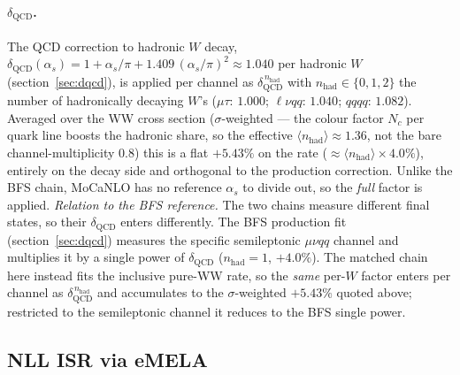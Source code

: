 \documentclass[11pt,a4paper]{article}
\begin{document}
\paragraph{$\delta_\text{QCD}$.} The QCD correction to hadronic $W$ decay,
$\delta_\text{QCD}(\alpha_s)=1+\alpha_s/\pi+1.409\,(\alpha_s/\pi)^2\approx1.040$ per
hadronic $W$~\cite{BFSnnlo} (section~\ref{sec:dqcd}), is applied per channel as
$\delta_\text{QCD}^{\,n_\text{had}}$ with $n_\text{had}\in\{0,1,2\}$ the number of
hadronically decaying $W$'s ($\mu\tau$: $1.000$; $\ell\nu qq$: $1.040$; $qqqq$:
$1.082$). Averaged over the WW cross section ($\sigma$-weighted --- the colour factor
$N_c$ per quark line boosts the hadronic share, so the effective
$\langle n_\text{had}\rangle\approx1.36$, not the bare channel-multiplicity $0.8$)
this is a flat $+5.43\%$ on the rate ($\approx\langle n_\text{had}\rangle\times4.0\%$),
entirely on the decay side and
orthogonal to the production correction. Unlike the BFS chain, MoCaNLO has no
reference $\alpha_s$ to divide out, so the \emph{full} factor is applied.
\emph{Relation to the BFS reference.} The two chains measure different final
states, so their $\delta_\text{QCD}$ enters differently. The BFS production fit
(section~\ref{sec:dqcd}) measures the specific semileptonic $\mu\nu qq$ channel
and multiplies it by a single power of $\delta_\text{QCD}$ ($n_\text{had}=1$,
$+4.0\%$). The matched chain here instead fits the inclusive pure-WW rate, so the
\emph{same} per-$W$ factor enters per channel as
$\delta_\text{QCD}^{\,n_\text{had}}$ and accumulates to the $\sigma$-weighted
$+5.43\%$ quoted above; restricted to the semileptonic channel it reduces to the
BFS single power.

\subsection{NLL ISR via eMELA}\label{sec:match-nll}
\end{document}

